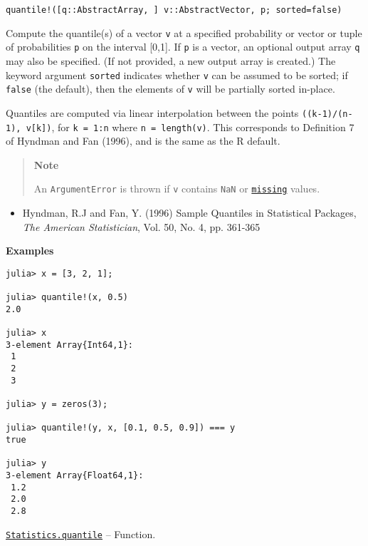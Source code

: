 \begin{adjustwidth}{2em}{0pt}


\begin{verbatim}
quantile!([q::AbstractArray, ] v::AbstractVector, p; sorted=false)
\end{verbatim}

Compute the quantile(s) of a vector \texttt{v} at a specified probability or vector or tuple of probabilities \texttt{p} on the interval [0,1]. If \texttt{p} is a vector, an optional output array \texttt{q} may also be specified. (If not provided, a new output array is created.) The keyword argument \texttt{sorted} indicates whether \texttt{v} can be assumed to be sorted; if \texttt{false} (the default), then the elements of \texttt{v} will be partially sorted in-place.

Quantiles are computed via linear interpolation between the points \texttt{((k-1)/(n-1), v[k])}, for \texttt{k = 1:n} where \texttt{n = length(v)}. This corresponds to Definition 7 of Hyndman and Fan (1996), and is the same as the R default.

\begin{quote}
\textbf{Note}

An \texttt{ArgumentError} is thrown if \texttt{v} contains \texttt{NaN} or \hyperlink{14596725676261444434}{\texttt{missing}} values.

\end{quote}
\begin{itemize}
\item Hyndman, R.J and Fan, Y. (1996) {\textquotedbl}Sample Quantiles in Statistical Packages{\textquotedbl}, \emph{The American Statistician}, Vol. 50, No. 4, pp. 361-365

\end{itemize}
\textbf{Examples}


\begin{verbatim}
julia> x = [3, 2, 1];

julia> quantile!(x, 0.5)
2.0

julia> x
3-element Array{Int64,1}:
 1
 2
 3

julia> y = zeros(3);

julia> quantile!(y, x, [0.1, 0.5, 0.9]) === y
true

julia> y
3-element Array{Float64,1}:
 1.2
 2.0
 2.8
\end{verbatim}



\end{adjustwidth}
\hypertarget{1313193106257799062}{} 
\hyperlink{1313193106257799062}{\texttt{Statistics.quantile}}  -- {Function.}


